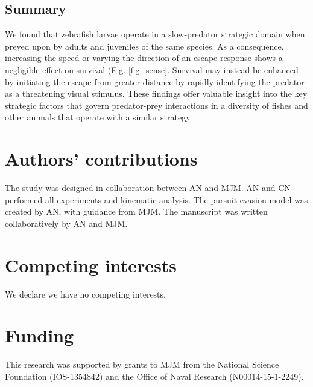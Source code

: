 \documentclass[]{rsos}%
\begin{document}
\subsection*{Summary} 

We found that zebrafish larvae operate in a slow-predator strategic domain when preyed upon by adults and juveniles of the same species.
As a consequence, increasing the speed or varying the direction of an escape response shows a negligible effect on survival (Fig. \ref{fig_sense}.
Survival may instead be enhanced by initiating the escape from greater distance by rapidly identifying the predator as a threatening visual stimulus.  
These findings offer valuable insight into the key strategic factors that govern predator-prey interactions in a diversity of fishes and other animals that operate with a similar strategy. 





\section*{Authors' contributions}

The study was designed in collaboration between AN and MJM.
AN and CN performed all experiments and kinematic analysis.
The pursuit-evasion model was created by AN, with guidance from MJM. 
The manuscript was written collaboratively by AN and MJM.

\section*{Competing interests}

We declare we have no competing interests.

\section*{Funding}

This research was supported by grants to MJM from the National Science Foundation (IOS-1354842) and the Office of Naval Research (N00014-15-1-2249).

\end{document}
